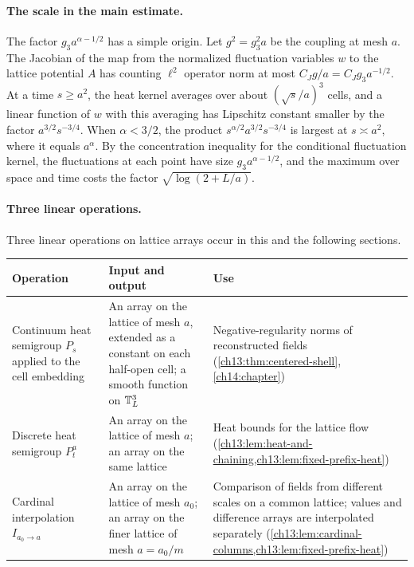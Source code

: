 \paragraph{The scale in the main estimate.}
The factor $g_3a^{\alpha-1/2}$ has a simple origin. Let $g^2=g_3^2a$ be the coupling at mesh $a$. The Jacobian of the map from the normalized fluctuation variables $w$ to the lattice potential $A$ has counting $\ell^2$ operator norm at most $C_Jg/a=C_Jg_3a^{-1/2}$. At a time $s\ge a^2$, the heat kernel averages over about $(\sqrt s/a)^3$ cells, and a linear function of $w$ with this averaging has Lipschitz constant smaller by the factor $a^{3/2}s^{-3/4}$. When $\alpha<3/2$, the product $s^{\alpha/2}a^{3/2}s^{-3/4}$ is largest at $s\asymp a^2$, where it equals $a^\alpha$. By the concentration inequality for the conditional fluctuation kernel, the fluctuations at each point have size $g_3a^{\alpha-1/2}$, and the maximum over space and time costs the factor $\sqrt{\log(2+L/a)}$.

\paragraph{Three linear operations.}
Three linear operations on lattice arrays occur in this and the following sections.
\begin{center}
\small
\begin{tabular}{p{}p{}p{}}
\toprule
Operation & Input and output & Use\\
\midrule
Continuum heat semigroup $P_s$ applied to the cell embedding & An array on the lattice of mesh $a$, extended as a constant on each half-open cell; a smooth function on $\mathbb T_L^3$ & Negative-regularity norms of reconstructed fields (\cref{ch13:thm:centered-shell}, \cref{ch14:chapter})\\
Discrete heat semigroup $P_t^a$ & An array on the lattice of mesh $a$; an array on the same lattice & Heat bounds for the lattice flow (\cref{ch13:lem:heat-and-chaining,ch13:lem:fixed-prefix-heat})\\
Cardinal interpolation $I_{a_0\to a}$ & An array on the lattice of mesh $a_0$; an array on the finer lattice of mesh $a=a_0/m$ & Comparison of fields from different scales on a common lattice; values and difference arrays are interpolated separately (\cref{ch13:lem:cardinal-columns,ch13:lem:fixed-prefix-heat})\\
\bottomrule
\end{tabular}
\end{center}

